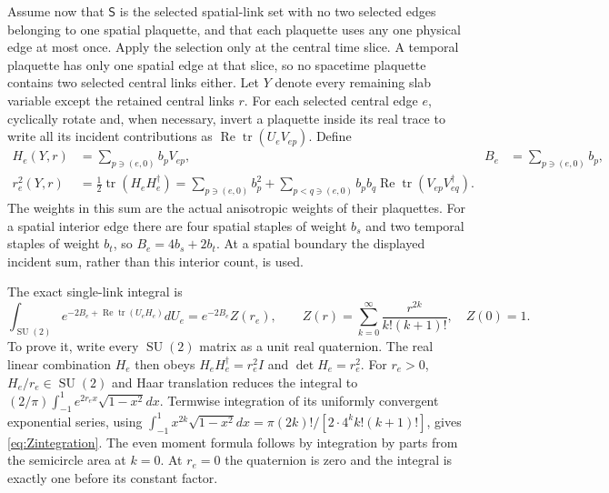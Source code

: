 \documentclass[11pt]{article}
\newcommand{\SU}{\operatorname{SU}}
\newcommand{\tr}{\operatorname{tr}}
\newcommand{\Rea}{\operatorname{Re}}
\begin{document}
Assume now that $\mathsf S$ is the selected spatial-link set with no
two selected edges belonging to one spatial plaquette, and that each
plaquette uses any one physical edge at most once. Apply the selection
only at the central time slice. A temporal plaquette has only one
spatial edge at that slice, so no spacetime plaquette contains two
selected central links either. Let $Y$ denote every remaining slab
variable except the retained central links $r$.
For each selected central edge $e$, cyclically rotate and, when
necessary, invert a plaquette inside its real trace to write all its
incident contributions as $\Rea\tr(U_eV_{ep})$. Define
\begin{align}
 H_e(Y,r)&=\sum_{p\ni(e,0)}b_pV_{ep},&
 B_e&=\sum_{p\ni(e,0)}b_p,\nonumber\\
 r_e^2(Y,r)&=\tfrac12\tr(H_eH_e^\dagger)
 =\sum_{p\ni(e,0)}b_p^2
   +\sum_{p<q\ni(e,0)}b_pb_q\Rea\tr(V_{ep}V_{eq}^\dagger).
   \label{eq:allstaples}
\end{align}
The weights in this sum are the actual anisotropic weights of their
plaquettes. For a spatial interior edge there are four spatial staples
of weight $b_s$ and two temporal staples of weight $b_t$, so
$B_e=4b_s+2b_t$. At a spatial boundary the displayed incident sum,
rather than this interior count, is used.

The exact single-link integral is
\begin{equation}\label{eq:Zintegration}
 \int_{\SU(2)}e^{-2B_e+\Rea\tr(U_eH_e)}dU_e
   =e^{-2B_e}Z(r_e),\qquad
 Z(r)=\sum_{k=0}^\infty\frac{r^{2k}}{k!(k+1)!},\quad Z(0)=1.
\end{equation}
To prove it, write every $\SU(2)$ matrix as a unit real quaternion.
The real linear combination $H_e$ then obeys
$H_eH_e^\dagger=r_e^2I$ and $\det H_e=r_e^2$.
For $r_e>0$, $H_e/r_e\in\SU(2)$ and Haar translation reduces the
integral to
$(2/\pi)\int_{-1}^1e^{2r_ex}\sqrt{1-x^2}dx$.
Termwise integration of its uniformly convergent exponential series,
using
$\int_{-1}^1x^{2k}\sqrt{1-x^2}dx
=\pi(2k)!/[2\cdot4^kk!(k+1)!]$, gives
\eqref{eq:Zintegration}. The even moment formula follows by integration
by parts from the semicircle area at $k=0$. At $r_e=0$ the quaternion
is zero and the integral is exactly one before its constant factor.
\end{document}
